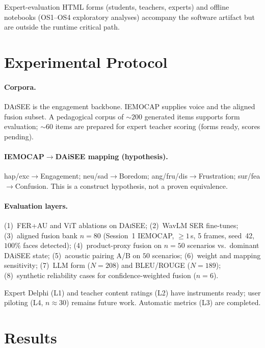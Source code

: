 \documentclass[conference]{IEEEtran}
\begin{document}
Expert-evaluation HTML forms (students, teachers, experts) and offline
notebooks (OS1--OS4 exploratory analyses) accompany the software artifact but
are outside the runtime critical path.

\section{Experimental Protocol}
\label{sec:exp}

\paragraph{Corpora.}
\textsc{DAiSEE} is the engagement backbone. \textsc{IEMOCAP} supplies voice and
the aligned fusion subset. A pedagogical corpus of $\sim\!200$ generated items
supports form evaluation; $\sim\!60$ items are prepared for expert teacher
scoring (forms ready, scores pending).

\paragraph{IEMOCAP$\rightarrow$DAiSEE mapping (hypothesis).}
hap/exc$\rightarrow$Engagement; neu/sad$\rightarrow$Boredom;
ang/fru/dis$\rightarrow$Frustration; sur/fea$\rightarrow$Confusion. This is a
construct hypothesis, not a proven equivalence.

\paragraph{Evaluation layers.}
(1)~FER+AU and ViT ablations on \textsc{DAiSEE};
(2)~WavLM SER fine-tunes;
(3)~aligned fusion bank $n{=}80$ (Session~1 IEMOCAP, $\ge 1$\,s, 5 frames,
seed~42, $100\%$ faces detected);
(4)~product-proxy fusion on $n{=}50$ scenarios vs.\ dominant DAiSEE state;
(5)~acoustic pairing A/B on $50$ scenarios;
(6)~weight and mapping sensitivity;
(7)~LLM form ($N{=}208$) and BLEU/ROUGE ($N{=}189$);
(8)~synthetic reliability cases for confidence-weighted fusion ($n{=}6$).

Expert Delphi (L1) and teacher content ratings (L2) have instruments ready;
user piloting (L4, $n{\approx}30$) remains future work. Automatic metrics
(L3) are completed.

\section{Results}
\label{sec:results}
\end{document}
